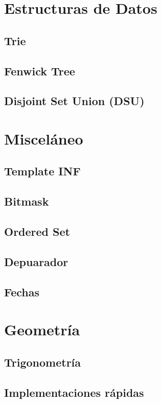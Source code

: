 \section{Estructuras de Datos}

\subsection{Trie}

\subsection{Fenwick Tree}

\subsection{Disjoint Set Union (DSU)}

\section{Misceláneo}

\subsection{Template INF}

\subsection{Bitmask}

\subsection{Ordered Set}

\subsection{Depuarador}


\subsection{Fechas}

\section{Geometría}

\subsection{Trigonometría}

\subsection{Implementaciones rápidas}



